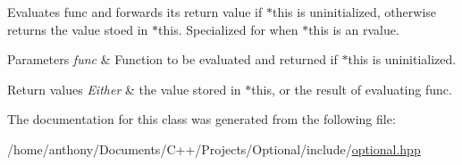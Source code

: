 Evaluates func and forwards its return value if $\ast$this is uninitialized, otherwise returns the value stoed in $\ast$this. Specialized for when $\ast$this is an rvalue.


\begin{DoxyParams}{Parameters}
{\em func} & Function to be evaluated and returned if $\ast$this is uninitialized. \\
\hline
\end{DoxyParams}

\begin{DoxyRetVals}{Return values}
{\em Either} & the value stored in $\ast$this, or the result of evaluating func. \\
\hline
\end{DoxyRetVals}


The documentation for this class was generated from the following file\+:\begin{DoxyCompactItemize}
\item 
/home/anthony/\+Documents/\+C++/\+Projects/\+Optional/include/\hyperlink{optional_8hpp}{optional.\+hpp}\end{DoxyCompactItemize}
